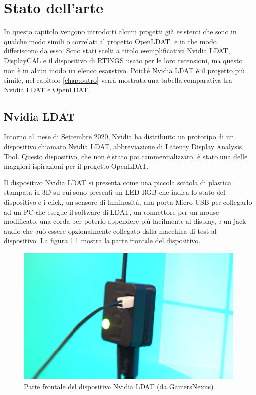 \setlength{\parskip}{1em}
\setlength{\parindent}{0pt}
\chapter{Stato dell'arte}
\label{chap:statoarte}

In questo capitolo vengono introdotti alcuni progetti già esistenti che sono in qualche modo simili o correlati al progetto OpenLDAT, e in che modo differiscono da esso. Sono stati scelti a titolo esemplificativo Nvidia LDAT, DisplayCAL e il dispositivo di RTINGS usato per le loro recensioni, ma questo non è in alcun modo un elenco esaustivo. Poiché Nvidia LDAT è il progetto più simile, nel capitolo \ref{chap:outro} verrà mostrata una tabella comparativa tra Nvidia LDAT e OpenLDAT.

\section{Nvidia LDAT}
Intorno al mese di Settembre 2020, Nvidia ha distribuito un prototipo di un dispositivo chiamato Nvidia LDAT, abbreviazione di Latency Display Analysis Tool. Questo dispositivo, che non è stato poi commercializzato, è stato una delle maggiori ispirazioni per il progetto OpenLDAT.

Il dispositivo Nvidia LDAT si presenta come una piccola scatola di plastica stampata in 3D su cui sono presenti un LED RGB che indica lo stato del dispositivo e i click, un sensore di luminosità, una porta Micro-USB per collegarlo ad un PC che esegue il software di LDAT, un connettore per un mouse modificato, una corda per poterlo appendere più facilmente al display, e un jack audio che può essere opzionalmente collegato dalla macchina di test al dispositivo. La figura \ref{fig:nvldat_front} mostra la parte frontale del dispositivo.

\begin{figure}[h!]
	\centering
	\includegraphics[width=\textwidth]{StatoDellArte_files/nvldat_front.jpg}
	\caption{Parte frontale del dispositivo Nvidia LDAT (da GamersNexus)}
	\label{fig:nvldat_front}
\end{figure}

